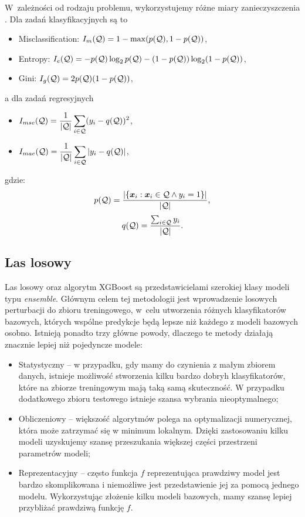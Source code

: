 \documentclass[inzynierska]{pwr_wmat_praca_dyplomowa}
\theoremstyle{plain}
\numberwithin{theorem}{chapter}
\theoremstyle{definition}
\numberwithin{theorem}{chapter}
\begin{document}
W~zależności od rodzaju problemu, wykorzystujemy różne miary zanieczyszczenia \cite{sklearn_api}. Dla zadań klasyfikacyjnych są to
\begin{itemize}
	\item Misclassification: $I_m(\mathcal{Q}) = 1 - \max(p(\mathcal{Q}), 1 - p(\mathcal{Q}))$,
	\item Entropy: $I_e(\mathcal{Q}) = -p(\mathcal{Q}) \log_2 p(\mathcal{Q}) - (1 - p(\mathcal{Q})) \log_2(1 - p(\mathcal{Q}))$,
	\item Gini: $I_g(\mathcal{Q}) = 2p(\mathcal{Q})(1 - p(\mathcal{Q}))$,
\end{itemize}{}
a dla zadań regresyjnych
\begin{itemize}
	\item $ \displaystyle I_{mse}(\mathcal{Q}) = \frac{1}{|\mathcal{Q}|} \sum_{i \in \mathcal{Q}} (y_i - q(\mathcal{Q}))^2$,
	\item $ \displaystyle I_{mae}(\mathcal{Q}) = \frac{1}{|\mathcal{Q}|} \sum_{i \in \mathcal{Q}} |y_i - q(\mathcal{Q})|$,
\end{itemize}
gdzie:
$$ p(\mathcal{Q}) = \frac{| \{ \boldsymbol{x}_i : \boldsymbol{x}_i \in \mathcal{Q} \land y_i = 1 \}|}{|\mathcal{Q}|} \text{,} $$
$$ q(\mathcal{Q}) = \frac{\sum_{i \in \mathcal{Q}} y_i}{|\mathcal{Q}|} \text{.} $$

\subsection{Las losowy}
Las losowy oraz algorytm XGBoost są przedstawicielami szerokiej klasy modeli typu \textit{ensemble}. Głównym celem tej metodologii jest wprowadzenie losowych perturbacji do zbioru treningowego, w~celu utworzenia różnych klasyfikatorów bazowych, których wspólne predykcje będą lepsze niż każdego z modeli bazowych osobno. Istnieją ponadto trzy główne powody, dlaczego te metody działają znacznie lepiej niż pojedyncze modele:
\begin{itemize}
	\item Statystyczny -- w przypadku, gdy mamy do czynienia z małym zbiorem danych, istnieje możliwość stworzenia kilku bardzo dobryh klasyfikatorów, które na zbiorze treningowym mają taką samą skuteczność. W przypadku dodatkowego zbioru testowego istnieje szansa wybrania nieoptymalnego;
	\item Obliczeniowy -- większość algorytmów polega na optymalizacji numerycznej, która może zatrzymać się w minimum lokalnym. Dzięki zastosowaniu kilku modeli uzyskujemy szansę przeszukania większej części przestrzeni parametrów modeli;
	\item Reprezentacyjny -- często funkcja $f$ reprezentująca prawdziwy model jest bardzo skomplikowana i niemożliwe jest przedstawienie jej za pomocą jednego modelu. Wykorzystując złożenie kilku modeli bazowych, mamy szansę lepiej przybliżać prawdziwą funkcję $f$.
\end{itemize}
\end{document}

